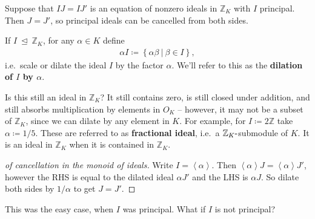 \begin{lemma}

Suppose that \(IJ = IJ'\) is an equation of nonzero ideals in
\({\mathbb{Z}}_K\) with \(I\) principal. Then \(J = J'\), so principal
ideals can be cancelled from both sides.

\end{lemma}

\begin{definition}

If \(I {~\trianglelefteq~}{\mathbb{Z}}_K\), for any \(\alpha\in K\)
define
\begin{align*}
\alpha I \coloneqq\left\{{ \alpha \beta {~\mathrel{\Big|}~}\beta \in I }\right\} 
,\end{align*}
i.e.~scale or dilate the ideal \(I\) by the factor \(\alpha\). We'll
refer to this as the \textbf{dilation of \(I\) by \(\alpha\)}.

\end{definition}

\begin{remark}

Is this still an ideal in \({\mathbb{Z}}_K\)? It still contains zero, is
still closed under addition, and still absorbs multiplication by
elements in \(O_K\) -- however, it may not be a subset of
\({\mathbb{Z}}_K\), since we can dilate by any element in \(K\). For
example, for \(I \coloneqq 2{\mathbb{Z}}\) take \(\alpha\coloneqq 1/5\).
These are referred to as \textbf{fractional ideal}, i.e.~a
\({\mathbb{Z}}_K{\hbox{-}}\)submodule of \(K\). It is an ideal in
\({\mathbb{Z}}_K\) when it is contained in \({\mathbb{Z}}_K\).

\end{remark}

\begin{proof}[of cancellation in the monoid of ideals]

Write \(I = \left\langle{ \alpha }\right\rangle\). Then
\(\left\langle{ \alpha }\right\rangle J = \left\langle{ \alpha }\right\rangle J'\),
however the RHS is equal to the dilated ideal \(\alpha J'\) and the LHS
is \(\alpha J\). So dilate both sides by \(1/ \alpha\) to get
\(J = J'\).

\end{proof}

\begin{remark}

This was the easy case, when \(I\) was principal. What if \(I\) is not
principal?

\end{remark}

